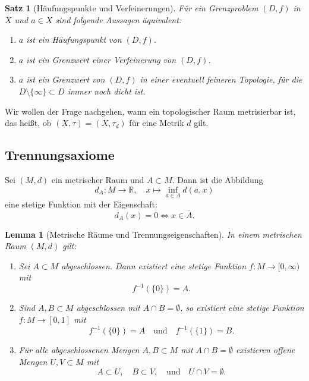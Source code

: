 \documentclass[a4paper,12pt]{article}
\theoremstyle{break}
\newtheorem{theorem}[definition]{Satz}
\newtheorem{lemma}[definition]{Lemma}
\begin{document}
\begin{theorem}[Häufungspunkte und Verfeinerungen]
Für ein Grenzproblem $(D, f)$ in $X$ und $a \in X$ sind folgende Aussagen äquivalent:
\begin{enumerate}
    \item $a$ ist ein Häufungspunkt von $(D, f)$.
    \item $a$ ist ein Grenzwert einer Verfeinerung von $(D, f)$.
    \item $a$ ist ein Grenzwert von $(D, f)$ in einer eventuell feineren Topologie, für die $D \setminus \{\infty\} \subset D$ immer noch dicht ist.
\end{enumerate}
\end{theorem}

Wir wollen der Frage nachgehen, wann ein topologischer Raum metrisierbar ist, das heißt, ob $(X, \tau) = (X, \tau_d)$ für eine Metrik $d$ gilt.

\subsection{Trennungsaxiome}
Sei $(M, d)$ ein metrischer Raum und $A \subset M$. Dann ist die Abbildung
\[
d_A: M \to \mathbb{R}, \quad x \mapsto \inf_{a \in A} d(a, x)
\]
eine stetige Funktion mit der Eigenschaft:
\[
d_A(x) = 0 \iff x \in \overline{A}.
\]

\begin{lemma}[Metrische Räume und Trennungseigenschaften]
In einem metrischen Raum $(M, d)$ gilt:
\begin{enumerate}
    \item Sei $A \subset M$ abgeschlossen. Dann existiert eine stetige Funktion $f: M \to [0, \infty)$ mit 
    \[
    f^{-1}(\{0\}) = A.
    \]
    
    \item Sind $A, B \subset M$ abgeschlossen mit $A \cap B = \emptyset$, so existiert eine stetige Funktion $f: M \to [0,1]$ mit
    \[
    f^{-1}(\{0\}) = A \quad \text{und} \quad f^{-1}(\{1\}) = B.
    \]

    \item Für alle abgeschlossenen Mengen $A, B \subset M$ mit $A \cap B = \emptyset$ existieren offene Mengen $U, V \subset M$ mit
    \[
    A \subset U, \quad B \subset V, \quad \text{und} \quad U \cap V = \emptyset.
    \]
\end{enumerate}
\end{lemma}
\end{document}
